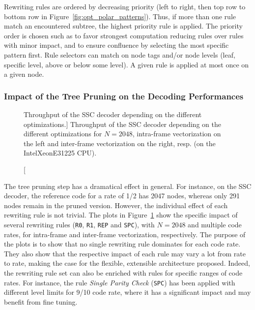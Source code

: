 Rewriting rules are ordered by decreasing priority (left to right, then top row
to bottom row in Figure~\ref{fig:opt_polar_patterns}). Thus, if more than one
rule match an encountered subtree, the highest priority rule is applied. The
priority order is chosen such as to favor strongest computation reducing rules
over rules with minor impact, and to ensure confluence by selecting the most
specific pattern first. Rule selectors can match on node tags and/or node levels
(leaf, specific level, above or below some level). A given rule is applied at
most once on a given node.

\subsubsection{Impact of the Tree Pruning on the Decoding Performances}

\begin{figure}[htp]
  \centering
  \quad
  \caption
    [Throughput of the SSC decoder depending on the different optimizations.]
    {Throughput of the SSC decoder depending on the different optimizations for
    $N = 2048$, intra-frame vectorization on the left and inter-frame
    vectorization on the right, resp. (on the Intel\R Xeon\TM E31225 CPU).}
  \label{plot:opt_polar_sc_tree_cut}
\end{figure}

The tree pruning step has a dramatical effect in general. For instance, on the
SSC decoder, the reference code for a rate of 1/2 has 2047 nodes, whereas only
291 nodes remain in the pruned version. However, the individual effect of each
rewriting rule is not trivial. The plots in
Figure~\ref{plot:opt_polar_sc_tree_cut} show the specific impact of several
rewriting rules (\verb|R0|, \verb|R1|, \verb|REP| and \verb|SPC|), with
$N = 2048$ and multiple code rates, for intra-frame and inter-frame
vectorization, respectively. The purpose of the plots is to show that no single
rewriting rule dominates for each code rate. They also show that the respective
impact of each rule may vary a lot from rate to rate, making the case for the
flexible, extensible architecture proposed. Indeed, the rewriting rule set can
also be enriched with rules for specific ranges of code rates. For instance, the
rule \emph{Single Parity Check} (\verb|SPC|) has been applied with different
level limits for 9/10 code rate, where it has a significant impact and may
benefit from fine tuning.

